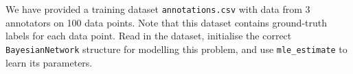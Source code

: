 \item {}

We have provided a training dataset \texttt{annotations.csv} with data from 3 annotators on 100 data points. Note that this dataset contains ground-truth labels for each data point. Read in the dataset, initialise the correct \texttt{BayesianNetwork} structure for modelling this problem, and use \texttt{mle\_estimate} to learn its parameters.

